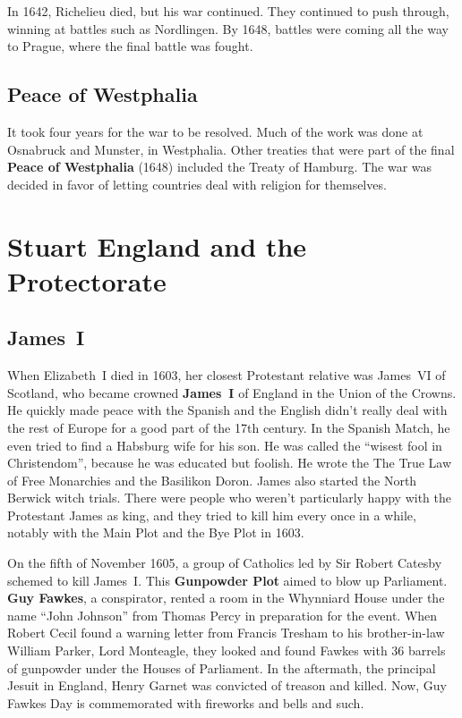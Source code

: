 In 1642, Richelieu died, but his war continued.
They continued to push through, winning at battles such as Nordlingen.
By 1648, battles were coming all the way to Prague, where the final battle was fought.

\subsection*{Peace of Westphalia}

It took four years for the war to be resolved.
Much of the work was done at Osnabruck and Munster, in Westphalia.
Other treaties that were part of the final \textbf{Peace of Westphalia} (1648)
included the Treaty of Hamburg.
The war was decided in favor of letting countries deal with religion for themselves.

\section{Stuart England and the Protectorate}

\subsection*{James~I}

When Elizabeth~I died in 1603, her closest Protestant relative was
James~VI of Scotland, who became crowned \textbf{James~I} of England in the Union of the Crowns.
He quickly made peace with the Spanish
and the English didn't really deal with the rest of Europe for a good part of the 17th century.
In the Spanish Match, he even tried to find a Habsburg wife for his son.
He was called the ``wisest fool in Christendom'', because he was educated but foolish.
He wrote the The True Law of Free Monarchies and the Basilikon Doron.
James also started the North Berwick witch trials.
There were people who weren't particularly happy with the Protestant James as king,
and they tried to kill him every once in a while, notably with the Main Plot and the Bye Plot in 1603.

On the fifth of November 1605, a group of Catholics led by Sir Robert Catesby schemed to kill James~I.
This \textbf{Gunpowder Plot} aimed to blow up Parliament.
\textbf{Guy Fawkes}, a conspirator, rented a room in the Whynniard House
under the name ``John Johnson'' from Thomas Percy in preparation for the event.
When Robert Cecil found a warning letter from Francis Tresham to his brother-in-law William Parker, Lord Monteagle,
they looked and found Fawkes with 36 barrels of gunpowder under the Houses of Parliament.
In the aftermath, the principal Jesuit in England, Henry Garnet was convicted of treason and killed.
Now, Guy Fawkes Day is commemorated with fireworks and bells and such.

